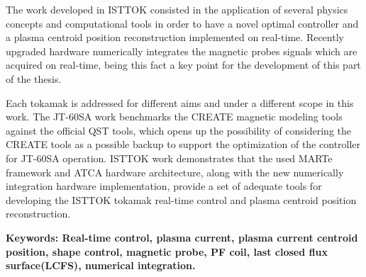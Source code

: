  The work developed in ISTTOK consisted in the application of several physics concepts and computational tools in order to have a novel optimal controller and a plasma centroid position reconstruction implemented on real-time. Recently upgraded hardware numerically integrates  the magnetic probes signals which are acquired on real-time, being this fact a key point for the development of this part of the thesis.\smallskip
 

 

Each tokamak is addressed for different aims and under a different scope in this work. The JT-60SA work benchmarks the CREATE magnetic modeling tools against the official QST tools, which opens up the possibility of considering the CREATE tools as a possible backup to support the optimization of the controller for JT-60SA operation. ISTTOK work demonstrates that the used MARTe framework and ATCA hardware architecture, along with the new numerically integration hardware implementation, provide a set of adequate tools for developing the ISTTOK tokamak real-time control and plasma centroid position reconstruction.
 


\textbf{Keywords: Real-time control, plasma current, plasma current centroid position,   shape control, magnetic probe, PF coil, last closed flux surface(LCFS), numerical integration.} 

